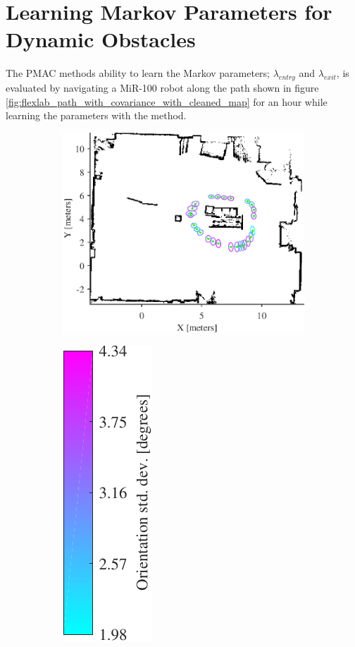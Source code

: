 \section{Learning Markov Parameters for Dynamic Obstacles}
\label{sec:learning_markov_evaluation}
The PMAC methods ability to learn the Markov parameters; $\lambda_{entry}$ and $\lambda_{exit}$, is evaluated by navigating a MiR-100 robot along the path shown in figure \ref{fig:flexlab_path_with_covariance_with_cleaned_map} for an hour while learning the parameters with the method.

\begin{figure}[htbp]
    \begin{subfigure}[t]{0.7\textwidth}	
        \centering	
        \includegraphics[scale=1.0]{chapters/evaluation/figures/flexlab_path_with_covariance_with_cleaned_map}
    \end{subfigure}
    \begin{subfigure}[t]{0.2\textwidth}
        \centering
        \includegraphics[scale=1.0]{chapters/evaluation/figures/flexlab_path_with_covariance_bar-crop}

\end{subfigure}
\end{figure}
